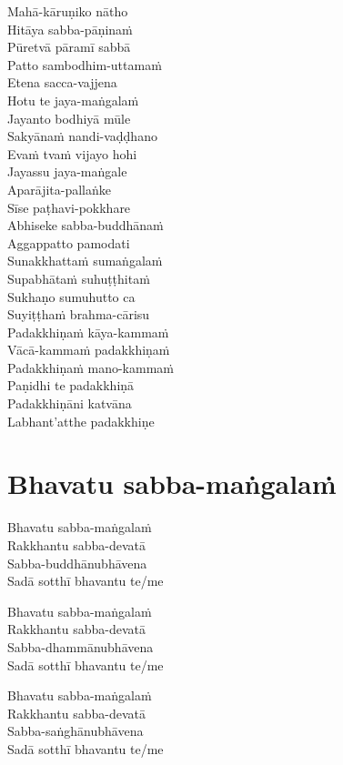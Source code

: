 \begin{paritta}

Mahā-kāruṇiko nātho\\
Hitāya sabba-pāṇinaṁ\\
Pūretvā pāramī sabbā\\
Patto sambodhim-uttamaṁ\\
Etena sacca-vajjena\\
Hotu te jaya-maṅgalaṁ\\
Jayanto bodhiyā mūle\\
Sakyānaṁ nandi-vaḍḍhano\\
Evaṁ tvaṁ vijayo hohi\\
Jayassu jaya-maṅgale\\
Aparājita-pallaṅke\\
Sīse paṭhavi-pokkhare\\
Abhiseke sabba-buddhānaṁ\\
Aggappatto pamodati\\
Sunakkhattaṁ sumaṅgalaṁ\\
Supabhātaṁ suhuṭṭhitaṁ\\
Sukhaṇo sumuhutto ca\\
Suyiṭṭhaṁ brahma-cārisu\\
Padakkhiṇaṁ kāya-kammaṁ\\
Vācā-kammaṁ padakkhiṇaṁ\\
Padakkhiṇaṁ mano-kammaṁ\\
Paṇidhi te padakkhiṇā\\
Padakkhiṇāni katvāna\\
Labhant'atthe padakkhiṇe


\end{paritta}

\clearpage

\chapter{Bhavatu sabba-maṅgalaṁ}%


\begin{paritta}
Bhavatu sabba-maṅgalaṁ\\
Rakkhantu sabba-devatā\\
Sabba-buddhānubhāvena\\
Sadā sotthī bhavantu te/me

Bhavatu sabba-maṅgalaṁ\\
Rakkhantu sabba-devatā\\
Sabba-dhammānubhāvena\\
Sadā sotthī bhavantu te/me

Bhavatu sabba-maṅgalaṁ\\
Rakkhantu sabba-devatā\\
Sabba-saṅghānubhāvena\\
Sadā sotthī bhavantu te/me
\end{paritta}

